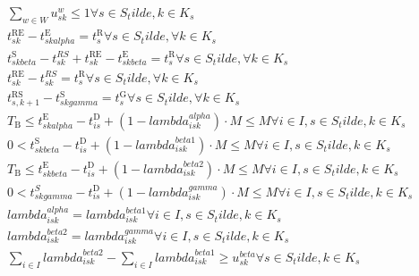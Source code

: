 \begin{align}
  & \sum_{w \in W} u_{\mathit{sk}}^{w} \leq 1 \forall s \in S_tilde , k \in K_{s} \tag{eq\_0014} \\
  & t_{\mathit{sk}}^{\text{RE}} - t_{\mathit{sk} \mathit{alpha}}^{\text{E}} = t_{s}^{\text{R}} \forall s \in S_tilde , \forall k \in K_{s} \tag{eq\_0015} \\
  & t_{\mathit{sk} \mathit{beta}}^{\text{S}} - t_{\mathit{sk}}^{RS} + t_{\mathit{sk}}^{\text{RE}} - t_{\mathit{sk} \mathit{beta}}^{\text{E}} = t_{s}^{\text{R}} \forall s \in S_tilde , \forall k \in K_{s} \tag{eq\_0016} \\
  & t_{\mathit{sk}}^{\text{RE}} - t_{\mathit{sk}}^{RS} = t_{s}^{\text{R}} \forall s \in S_tilde , \forall k \in K_{s} \tag{eq\_0017} \\
  & t_{s , k + 1}^{\text{RS}} - t_{\mathit{sk} \mathit{gamma}}^{\text{S}} = t_{s}^{\text{G}} \forall s \in S_tilde , \forall k \in K_{s} \tag{eq\_0018} \\
  & T_{\text{B}} \leq t_{\mathit{sk} \mathit{alpha}}^{\text{E}} - t_{\mathit{is}}^{\text{D}} + \left(1 - \mathit{lambda}_{\mathit{isk}}^{\mathit{alpha}}\right) \cdot M \leq M \forall i \in I , s \in S_tilde , k \in K_{s} \tag{eq\_0019} \\
  & 0 < t_{\mathit{sk} \mathit{beta}}^{\text{S}} - t_{\mathit{is}}^{\text{D}} + \left(1 - \mathit{lambda}_{\mathit{isk}}^{\mathit{beta} 1}\right) \cdot M \leq M \forall i \in I , s \in S_tilde , k \in K_{s} \tag{eq\_0020} \\
  & T_{\text{B}} \leq t_{\mathit{sk} \mathit{beta}}^{\text{E}} - t_{\mathit{is}}^{\text{D}} + \left(1 - \mathit{lambda}_{\mathit{isk}}^{\mathit{beta} 2}\right) \cdot M \leq M \forall i \in I , s \in S_tilde , k \in K_{s} \tag{eq\_0021} \\
  & 0 < t_{\mathit{sk} \mathit{gamma}}^{S} - t_{\mathit{is}}^{\text{D}} + \left(1 - \mathit{lambda}_{\mathit{isk}}^{\mathit{gamma}}\right) \cdot M \leq M \forall i \in I , s \in S_tilde , k \in K_{s} \tag{eq\_0022} \\
  & \mathit{lambda}_{\mathit{isk}}^{\mathit{alpha}} = \mathit{lambda}_{\mathit{isk}}^{\mathit{beta} 1} \forall i \in I , s \in S_tilde , k \in K_{s} \tag{eq\_0023} \\
  & \mathit{lambda}_{\mathit{isk}}^{\mathit{beta} 2} = \mathit{lambda}_{\mathit{isk}}^{\mathit{gamma}} \forall i \in I , s \in S_tilde , k \in K_{s} \tag{eq\_0024} \\
  & \sum_{i \in I} \mathit{lambda}_{\mathit{isk}}^{\mathit{beta} 2} - \sum_{i \in I} \mathit{lambda}_{\mathit{isk}}^{\mathit{beta} 1} \geq u_{\mathit{sk}}^{\mathit{beta}} \forall s \in S_tilde , k \in K_{s} \tag{eq\_0025} \\

\end{align}
